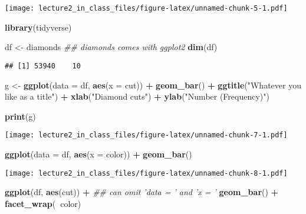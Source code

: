 \documentclass[]{article}
\newenvironment{Shaded}{\begin{snugshade}}{\end{snugshade}}
\newcommand{\CommentTok}[1]{\textcolor[rgb]{0.56,0.35,0.01}{\textit{#1}}}
\newcommand{\DataTypeTok}[1]{\textcolor[rgb]{0.13,0.29,0.53}{#1}}
\newcommand{\KeywordTok}[1]{\textcolor[rgb]{0.13,0.29,0.53}{\textbf{#1}}}
\newcommand{\NormalTok}[1]{#1}
\newcommand{\OperatorTok}[1]{\textcolor[rgb]{0.81,0.36,0.00}{\textbf{#1}}}
\newcommand{\StringTok}[1]{\textcolor[rgb]{0.31,0.60,0.02}{#1}}
\begin{document}
\texttt{[image: lecture2\_in\_class\_files/figure-latex/unnamed-chunk-5-1.pdf]}

\begin{Shaded}
\begin{Highlighting}[]
\KeywordTok{library}\NormalTok{(tidyverse)}

\NormalTok{df <-}\StringTok{ }\NormalTok{diamonds }\CommentTok{## diamonds comes with ggplot2}
\KeywordTok{dim}\NormalTok{(df)}
\end{Highlighting}
\end{Shaded}

\begin{verbatim}
## [1] 53940    10
\end{verbatim}

\begin{Shaded}
\begin{Highlighting}[]
\NormalTok{g <-}\StringTok{ }\KeywordTok{ggplot}\NormalTok{(}\DataTypeTok{data =}\NormalTok{ df, }\KeywordTok{aes}\NormalTok{(}\DataTypeTok{x =}\NormalTok{ cut)) }\OperatorTok{+}\StringTok{ }
\StringTok{  }\KeywordTok{geom_bar}\NormalTok{() }\OperatorTok{+}\StringTok{ }
\StringTok{  }\KeywordTok{ggtitle}\NormalTok{(}\StringTok{"Whatever you like as a title"}\NormalTok{) }\OperatorTok{+}
\StringTok{  }\KeywordTok{xlab}\NormalTok{(}\StringTok{"Diamond cuts"}\NormalTok{) }\OperatorTok{+}
\StringTok{  }\KeywordTok{ylab}\NormalTok{(}\StringTok{"Number (Frequency)"}\NormalTok{) }

\KeywordTok{print}\NormalTok{(g)}
\end{Highlighting}
\end{Shaded}

\texttt{[image: lecture2\_in\_class\_files/figure-latex/unnamed-chunk-7-1.pdf]}

\begin{Shaded}
\begin{Highlighting}[]
\KeywordTok{ggplot}\NormalTok{(}\DataTypeTok{data =}\NormalTok{ df, }\KeywordTok{aes}\NormalTok{(}\DataTypeTok{x =}\NormalTok{ color)) }\OperatorTok{+}\StringTok{ }\KeywordTok{geom_bar}\NormalTok{() }
\end{Highlighting}
\end{Shaded}

\texttt{[image: lecture2\_in\_class\_files/figure-latex/unnamed-chunk-8-1.pdf]}

\begin{Shaded}
\begin{Highlighting}[]
\KeywordTok{ggplot}\NormalTok{(df, }\KeywordTok{aes}\NormalTok{(cut)) }\OperatorTok{+}\StringTok{ }\CommentTok{## can omit 'data = ' and 'x = '}
\StringTok{  }\KeywordTok{geom_bar}\NormalTok{() }\OperatorTok{+}
\StringTok{  }\KeywordTok{facet_wrap}\NormalTok{(}\OperatorTok{~}\NormalTok{color)}
\end{Highlighting}
\end{Shaded}
\end{document}

